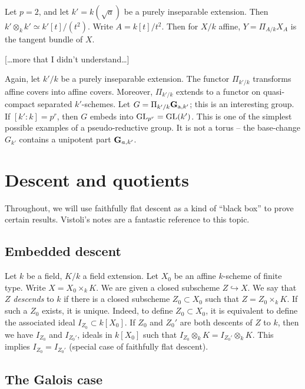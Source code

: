 \documentclass{article}
\begin{document}
\begin{example}
Let $p=2$, and let $k'=k(\sqrt a)$ be a purely inseparable extension. 
Then $k'\otimes_k k'\simeq k'[t]/(t^2)$. Write $A=k[t]/t^2$. Then for 
$X/k$ affine, $Y=\Pi_{A/k} X_A$ is the tangent bundle of $X$. 

[\ldots more that I didn't understand\ldots ]
\end{example}

Again, let $k'/k$ be a purely inseparable extension. The functor 
$\Pi_{k'/k}$ transforms affine covers into affine covers. Moreover, 
$\Pi_{k'/k}$ extends to a functor on quasi-compact separated 
$k'$-schemes. Let $G=\Pi_{k'/k} \mathbf{G}_{\mathrm{a},k'}$; this is an 
interesting group. If $[k':k]=p^r$, then $G$ embeds into 
$\operatorname{GL}_{p^r} = \operatorname{GL}(k')$. This is one of the simplest 
possible examples of a pseudo-reductive group. It is not a torus -- the 
base-change $G_{k'}$ contains a unipotent part $\mathbf{G}_{a,k'}$.





\section{Descent and quotients}

Throughout, we will use faithfully flat descent as a kind of ``black box'' to 
prove certain results. Vistoli's notes are a fantastic reference to this 
topic. 


\subsection{Embedded descent}

Let $k$ be a field, $K/k$ a field extension. Let $X_0$ be an affine $k$-scheme 
of finite type. Write $X=X_0\times_k K$. We are given a closed subscheme 
$Z\hookrightarrow X$. We say that $Z$ \emph{descends} to $k$ if there is a closed 
subscheme $Z_0\subset X_0$ such that $Z=Z_0\times_k K$. If such a $Z_0$ exists, 
it is unique. Indeed, to define $Z_0\subset X_0$, it is equivalent to 
define the associated ideal $I_{Z_0}\subset k[X_0]$. If $Z_0$ and $Z_0'$ are 
both descents of $Z$ to $k$, then we have $I_{Z_0}$ and $I_{Z_0'}$, ideals 
in $k[X_0]$ such that $I_{Z_0}\otimes_k K=I_{Z_0'}\otimes_k K$. This implies 
$I_{Z_0} = I_{Z_0'}$ (special case of faithfully flat descent). 


\subsection{The Galois case}
\end{document}
